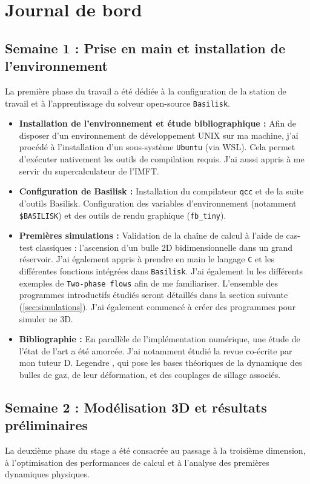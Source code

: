 \section{Journal de bord}

\subsection{Semaine 1 : Prise en main et installation de l'environnement}
La première phase du travail a été dédiée à la configuration de la station de travail et à l'apprentissage du solveur open-source \texttt{Basilisk}.

\begin{itemize}
    \item \textbf{Installation de l'environnement et étude bibliographique :} Afin de disposer d'un environnement de développement UNIX  sur ma machine, j'ai procédé à l'installation d'un sous-système \texttt{Ubuntu} (via WSL). Cela permet d'exécuter nativement les outils de compilation requis. J'ai aussi appris à me servir du supercalculateur de l'IMFT.
    \item \textbf{Configuration de Basilisk :} Installation du compilateur \texttt{qcc} et de la suite d'outils Basilisk. Configuration des variables d'environnement (notamment \texttt{\$BASILISK}) et des outils de rendu graphique (\texttt{fb\_tiny}).
    \item \textbf{Premières simulations :} Validation de la chaîne de calcul à l'aide de cas-test classiques : l'ascension d'un bulle 2D bidimensionnelle dans un grand réservoir. J'ai également appris à prendre en main le langage \texttt{C} et les différentes fonctions intégrées dans \texttt{Basilisk}. J'ai également lu les différents exemples de \texttt{Two-phase flows} afin de me familiariser. L'ensemble des programmes introductifs étudiés seront détaillés dans la section suivante (\ref{sec:simulations}). J'ai également commencé à créer des programmes pour simuler ne 3D.
    \item \textbf{Bibliographie :} En parallèle de l'implémentation numérique, une étude de l'état de l'art a été amorcée. J'ai notamment étudié la revue co-écrite par mon tuteur D. Legendre \cite{legendre2025}, qui pose les bases théoriques de la dynamique des bulles de gaz, de leur déformation, et des couplages de sillage associés.
\end{itemize}

\subsection{Semaine 2 : Modélisation 3D et résultats préliminaires}
La deuxième phase du stage a été consacrée au passage à la troisième dimension, à l'optimisation des performances de calcul et à l'analyse des premières dynamiques physiques.

